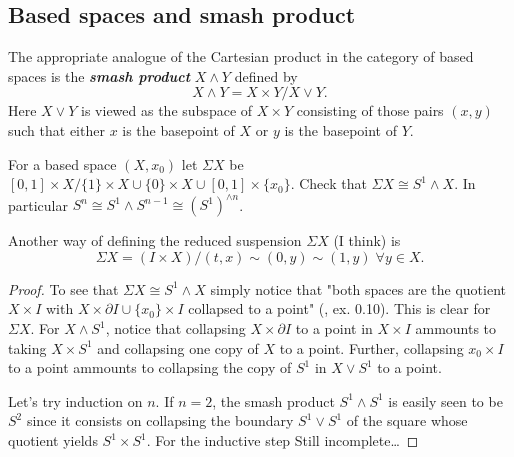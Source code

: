 \documentclass{article}
\numberwithin{equation}{section}
\begin{document}
\subsection{Based spaces and smash product}
\begin{defn}
	The appropriate analogue of the Cartesian product in the category of based spaces is the \textbf{\textit{smash product}} $X\wedge Y$ defined by
	\[X\wedge Y=X\times Y/X\vee Y.\]
	Here $X\vee Y$ is viewed as the subspace of $X\times Y$ consisting of those pairs $(x,y)$ such that either $x$ is the basepoint of $X$ or $y$ is the basepoint of $Y$.
\end{defn}
\begin{exercise}
	For a based space $(X,x_0)$ let $\Sigma X$ be $[0,1]\times X/\{1\}\times X\cup\{0\}\times X\cup[0,1]\times\{x_0\}$. Check that $\Sigma X\cong S^1\wedge X$. In particular $S^n\cong S^1\wedge S^{n-1}\cong (S^1)^{\wedge n}$.
\end{exercise}
\begin{remark}
	Another way of defining the reduced suspension $\Sigma X$ {\color{magenta}(I think)} is
	\[\Sigma X=(I\times X)/(t,x)\sim (0,y)\sim (1,y)\;\forall y\in X.\]
\end{remark}
\begin{proof}
	To see that $\Sigma X\cong S^1\wedge X$ simply notice that "both spaces are the quotient $X\times I$ with $X\times\partial I\cup\{x_0\}\times I$ collapsed to a point" (\cite{hatcher-at}, ex. 0.10). This is clear for $\Sigma X$. For $X\wedge S^1$, notice that collapsing $X\times\partial I$ to a point in $X\times I$ ammounts to taking $X\times S^1$ and collapsing one copy of $X$ to a point. Further, collapsing ${x_0}\times I$ to a point ammounts to collapsing the copy of $S^1$ in $X\vee S^1$ to a point.
	
	Let's try induction on $n$. If $n=2$, the smash product $S^1\wedge S^1$ is easily seen to be $S^2$ since it consists on collapsing the boundary $S^1\vee S^1$ of the square whose quotient yields $S^1\times S^1$. For the inductive step {\color{orange}Still incomplete…}
\end{proof}
\end{document}
